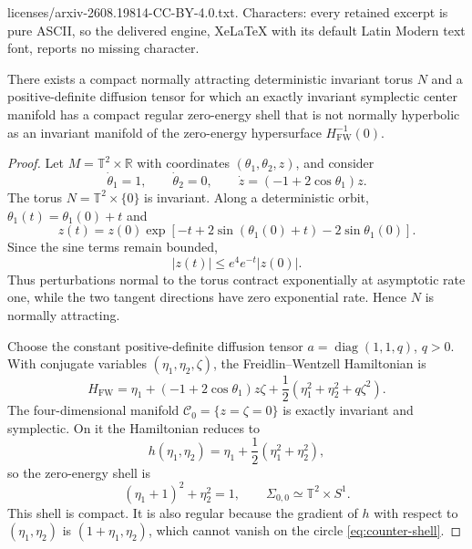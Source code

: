\documentclass[10pt,a4paper]{amsart}
\newcommand{\C}{\mathcal{C}}
\newcommand{\Hs}{H_{\mathrm{FW}}}
\newcommand{\R}{\mathbb{R}}
\newcommand{\T}{\mathbb{T}}
\newcommand{\diag}{\operatorname{diag}}
\begin{document}
licenses/arxiv-2608.19814-CC-BY-4.0.txt. Characters: every retained excerpt is pure ASCII, so the delivered engine, XeLaTeX with its default Latin Modern text font, reports no missing character.
\begin{proposition}
\label{prop:counterexample}
There exists a compact normally attracting deterministic invariant torus $N$ and a positive-definite diffusion tensor for which an exactly invariant symplectic center manifold has a compact regular zero-energy shell that is not normally hyperbolic as an invariant manifold of the zero-energy hypersurface $\Hs^{-1}(0)$.
\end{proposition}

\begin{proof}
Let $M=\T^2\times\R$ with coordinates $(\theta_1,\theta_2,z)$, and consider
\begin{equation}
\dot\theta_1=1,
\qquad
\dot\theta_2=0,
\qquad
\dot z=(-1+2\cos\theta_1)z.
\label{eq:counter-drift}
\end{equation}
The torus $N=\T^2\times\{0\}$ is invariant.  Along a deterministic orbit, $\theta_1(t)=\theta_1(0)+t$ and
\[
z(t)=z(0)\exp\!\left[-t+2\sin(\theta_1(0)+t)-2\sin\theta_1(0)\right].
\]
Since the sine terms remain bounded,
\[
|z(t)|\le e^4e^{-t}|z(0)|.
\]
Thus perturbations normal to the torus contract exponentially at asymptotic rate one, while the two tangent directions have zero exponential rate.  Hence $N$ is normally attracting.

Choose the constant positive-definite diffusion tensor $a=\diag(1,1,q)$, $q>0$.  With conjugate variables $(\eta_1,\eta_2,\zeta)$, the Freidlin--Wentzell Hamiltonian is
\begin{equation}
\Hs
=
\eta_1+(-1+2\cos\theta_1)z\zeta
+\frac12(\eta_1^2+\eta_2^2+q\zeta^2).
\label{eq:counter-H}
\end{equation}
The four-dimensional manifold $\C_0=\{z=\zeta=0\}$ is exactly invariant and symplectic.  On it the Hamiltonian reduces to
\[
h(\eta_1,\eta_2)=\eta_1+\frac12(\eta_1^2+\eta_2^2),
\]
so the zero-energy shell is
\begin{equation}
(\eta_1+1)^2+\eta_2^2=1,
\qquad
\Sigma_{0,0}\simeq\T^2\times S^1.
\label{eq:counter-shell}
\end{equation}
This shell is compact.  It is also regular because the gradient of $h$ with respect to $(\eta_1,\eta_2)$ is $(1+\eta_1,\eta_2)$, which cannot vanish on the circle \eqref{eq:counter-shell}.


\end{proof}
\end{document}
